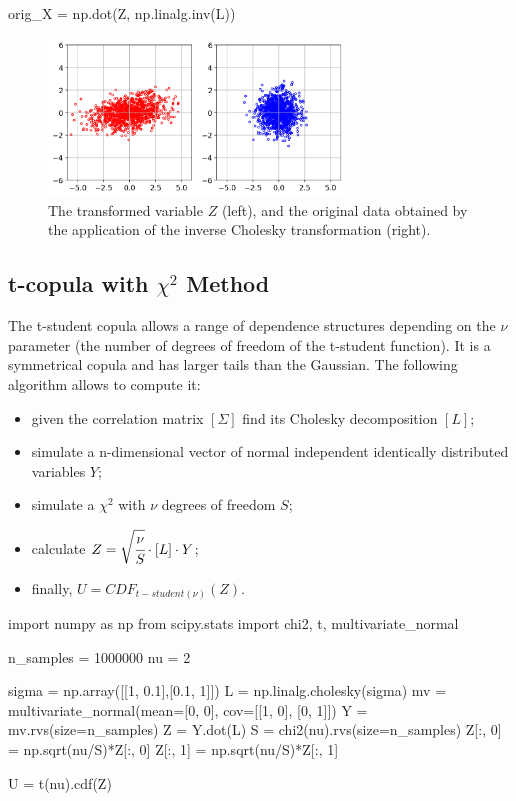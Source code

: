 \begin{ipython}
orig_X = np.dot(Z, np.linalg.inv(L))
\end{ipython}

\begin{figure}[htbp]
\centering
\includegraphics[width=0.7\textwidth]{figures/cholesky_inv}
\caption{The transformed variable $Z$ (left), and the original data obtained by the application of the inverse Cholesky transformation (right).}
\label{fig:cholesky_inv}
\end{figure}

\subsection{t-copula with $\chi^2$ Method}
\label{sec:t-student_copula}
The t-student copula allows a range of dependence structures depending
on the $\nu$ parameter (the number of degrees of freedom of the t-student function).
It is a symmetrical copula and has larger tails than the Gaussian. The following algorithm allows to compute it:
\begin{itemize}
\item given the correlation matrix $[\Sigma]$ find its Cholesky decomposition $[L]$;
\item simulate a n-dimensional vector of normal independent identically distributed variables $Y$;
\item simulate a $\chi^2$ with $\nu$ degrees of freedom $S$;
\item calculate $Z = \sqrt{\cfrac{\nu}{S}}\cdot [L] \cdot Y$;
\item finally, $U = CDF_{t-student(\nu)}(Z)$.
\end{itemize}

\begin{ipython}
import numpy as np
from scipy.stats import chi2, t, multivariate_normal

n_samples = 1000000
nu = 2

sigma = np.array([[1, 0.1],[0.1, 1]])
L = np.linalg.cholesky(sigma)
mv = multivariate_normal(mean=[0, 0], cov=[[1, 0], [0, 1]])
Y = mv.rvs(size=n_samples)
Z = Y.dot(L)
S = chi2(nu).rvs(size=n_samples)
Z[:, 0] = np.sqrt(nu/S)*Z[:, 0]
Z[:, 1] = np.sqrt(nu/S)*Z[:, 1]

U = t(nu).cdf(Z)
\end{ipython}

